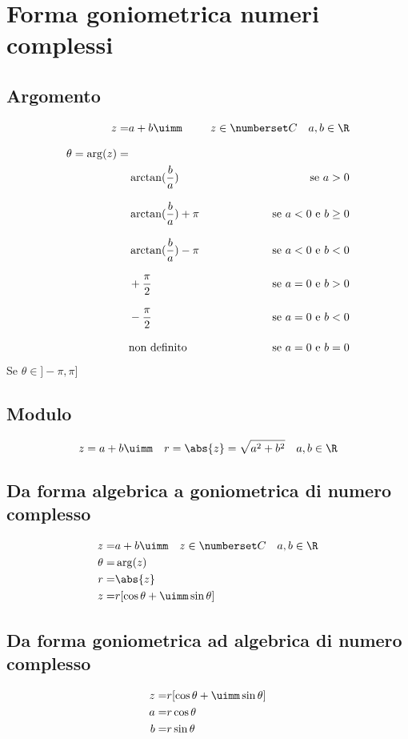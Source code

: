 \chapter{Forma goniometrica numeri complessi}
\section{Argomento}
\begin{align*}
z=&a+b\uimm& z\in\Co\quad a,b\in\R\\[8pt]
\theta=\arg(z)=&\\
&\arctan(\dfrac{b}{a})&\text{se}\ a>0 \\[8pt]
&\arctan(\dfrac{b}{a})+\pi&\text{se}\ a<0 \ \text{e} \ b\geq0\\[8pt]
&\arctan(\dfrac{b}{a})-\pi&\text{se}\ a<0\ \text{e} \ b<0\\[8pt]
&+\dfrac{\pi}{2}&\text{se}\ a=0 \ \text{e} \ b>0\\[8pt]
&-\dfrac{\pi}{2}&\text{se}\ a=0 \ \text{e} \ b<0\\[8pt]
&\text{non definito}&\text{se}\ a=0 \ \text{e} \ b=0
\end{align*}
Se $\theta\in]-\pi,\pi]$
 \section{Modulo}
\begin{equation}
z=a+b\uimm\quad r=\abs{z}=\sqrt{a^2+b^2}\quad a,b\in\R
\end{equation}
\section{Da forma algebrica a goniometrica di numero complesso}
\begin{align*}
z=&a+b\uimm\quad z\in\Co\quad a,b\in\R\\
\theta=&\arg(z)\\
r=&\abs{z}\\
z=&r[\cos\theta+\uimm\sin\theta]
\end{align*}
\section{Da forma goniometrica ad algebrica di numero complesso}
\begin{align*}
z=&r[\cos\theta+\uimm\sin\theta]\\
a=&r\cos\theta\\
b=&r\sin\theta
\end{align*}
